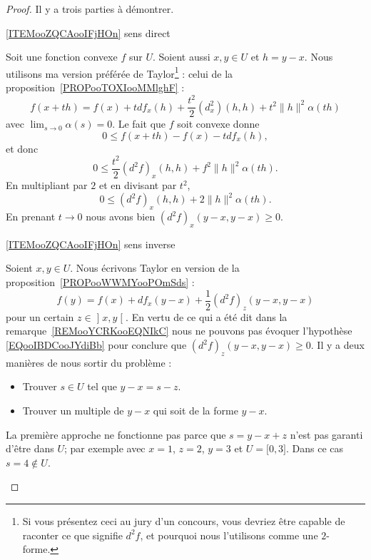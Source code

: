 \begin{proof}
    Il y a trois parties à démontrer.
    \begin{subproof}
    \item[\ref{ITEMooZQCAooIFjHOn} sens direct]

        Soit une fonction convexe \( f\) sur \( U\). Soient aussi \( x,y\in U\) et \( h=y-x\). Nous utilisons ma version préférée de Taylor\footnote{Si vous présentez ceci au jury d'un concours, vous devriez être capable de raconter ce que signifie \( d^2f\), et pourquoi nous l'utilisons comme une \( 2\)-forme.} : celui de la proposition~\ref{PROPooTOXIooMMlghF} :
        \begin{equation}
            f(x+th)=f(x)+tdf_x(h)+\frac{ t^2 }{2}(d^2_x)(h,h)+t^2\| h \|^2\alpha(th)
        \end{equation}
        avec \( \lim_{s\to 0}\alpha(s)=0\). Le fait que \( f\) soit convexe donne
        \begin{equation}
            0\leq f(x+th)-f(x)-tdf_x(h),
        \end{equation}
        et donc
        \begin{equation}
            0\leq \frac{ t^2 }{2}(d^2f)_x(h,h)+f^2\| h \|^2\alpha(th).
        \end{equation}
        En multipliant par \( 2\) et en divisant par \( t^2\),
        \begin{equation}
            0\leq (d^2f)_x(h,h)+2\| h \|^2\alpha(th).
        \end{equation}
        En prenant \( t\to 0\) nous avons bien  \( (d^2f)_x(y-x,y-x)\geq 0\).

    \item[\ref{ITEMooZQCAooIFjHOn} sens inverse]

        Soient \( x,y\in U\). Nous écrivons Taylor en version de la proposition~\ref{PROPooWWMYooPOmSds} :
        \begin{equation}
            f(y)=f(x)+df_x(y-x)+\frac{ 1 }{2}(d^2f)_z(y-x,y-x)
        \end{equation}
        pour un certain \( z\in\mathopen] x , y \mathclose[\). En vertu de ce qui a été dit dans la remarque~\ref{REMooYCRKooEQNIkC} nous ne pouvons pas évoquer l'hypothèse \eqref{EQooIBDCooJYdiBb} pour conclure que \( (d^2f)_z(y-x,y-x)\geq 0\). Il y a deux manières de nous sortir du problème :
        \begin{itemize}
            \item Trouver \( s\in U\) tel que \( y-x=s-z\).
            \item Trouver un multiple de \( y-x\) qui soit de la forme \( y-x\).
        \end{itemize}
        La première approche ne fonctionne pas parce que \( s=y-x+z\) n'est pas garanti d'être dans \( U\); par exemple avec \( x=1\), \( z=2\), \( y=3\) et \( U=\mathopen[ 0 , 3 \mathclose]\). Dans ce cas \( s=4\notin U\).


\end{subproof}
\end{proof}
